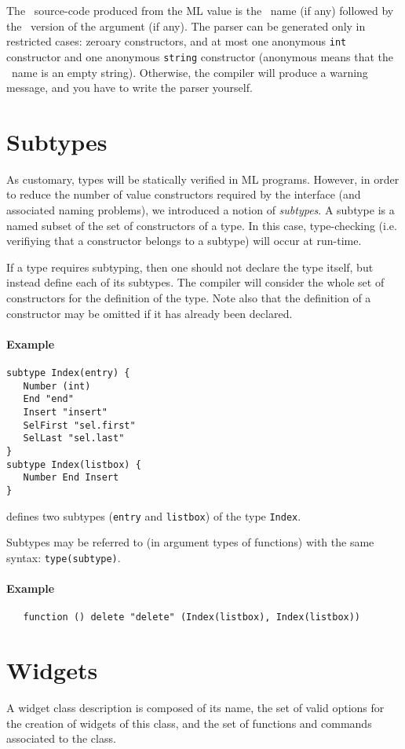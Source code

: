 The \tk\ source-code produced from the ML value is the \tk\ name (if any)
followed by the \tk\ version of the argument (if any).
The parser can be generated only in restricted cases: zeroary constructors,
and at most one anonymous \verb|int| constructor and one anonymous
\verb|string| constructor (anonymous means that the \tk\ name is an empty
string). Otherwise, the compiler will produce a warning
message, and you have to write the parser yourself. 

\section{Subtypes}
As customary, types will be statically verified in ML programs. However, in
order to reduce the number of value constructors required by the interface
(and associated naming problems),
we introduced a notion of {\em subtypes}. A subtype is a named subset of the
set of constructors of a type. In this case, type-checking (i.e. verifiying
that a constructor belongs to a subtype) will occur at run-time.

If a type requires subtyping, then one should not declare the type itself,
but instead define each of its subtypes. The compiler will consider the
whole set of constructors for the definition of the type. Note also that the
definition of a constructor may be omitted if it has  already been declared.

\paragraph{Example}
\begin{verbatim}
subtype Index(entry) {
   Number (int)
   End "end"
   Insert "insert"
   SelFirst "sel.first"
   SelLast "sel.last" 
}
subtype Index(listbox) {
   Number End Insert 
}
\end{verbatim}
defines two subtypes (\verb|entry| and \verb|listbox|) of the type
\verb|Index|.  

Subtypes may be referred to (in argument types of functions) with the same
syntax: \verb|type(subtype)|.
\paragraph{Example}
\begin{verbatim}
   function () delete "delete" (Index(listbox), Index(listbox))
\end{verbatim} 

\section{Widgets}
A widget class description is composed of its name, the set of valid options
for the creation of widgets of this class, and the set of functions and
commands associated to the class.

